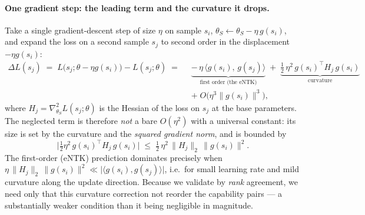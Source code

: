 \documentclass{article} %
\begin{document}
\paragraph{One gradient step: the leading term and the curvature it drops.}
Take a single gradient-descent step of size $\eta$ on sample $s_i$,
$\theta_S \leftarrow \theta_S - \eta\, g(s_i)$, and expand the loss on a second sample $s_j$ to
second order in the displacement $-\eta g(s_i)$:
\begin{equation}
\begin{split}
  \Delta L(s_j)
  \;=\; L\!\big(s_j;\theta - \eta g(s_i)\big) - L(s_j;\theta)
  \;=\;\; & \underbrace{-\,\eta\,\big\langle g(s_i),\, g(s_j)\big\rangle}_{\text{first order (the eNTK)}}
  \;+\; \underbrace{\tfrac{1}{2}\,\eta^2\, g(s_i)^{\!\top} H_j\, g(s_i)}_{\text{curvature}} \\[2pt]
  & +\; O\!\big(\eta^3 \|g(s_i)\|^3\big),
\end{split}
  \label{eq:secondorder}
\end{equation}
where $H_j = \nabla^2_{\theta_S} L(s_j;\theta)$ is the Hessian of the loss on $s_j$ at the base
parameters. The neglected term is therefore \emph{not} a bare $O(\eta^2)$ with a universal
constant: its size is set by the curvature and the \emph{squared gradient norm}, and is bounded by
\begin{equation}
  \Big|\tfrac{1}{2}\eta^2\, g(s_i)^{\!\top} H_j\, g(s_i)\Big|
  \;\le\; \tfrac{1}{2}\,\eta^2\,\|H_j\|_2\,\|g(s_i)\|^2 .
  \label{eq:curvbound}
\end{equation}
The first-order (eNTK) prediction dominates precisely when
$\eta\,\|H_j\|_2\,\|g(s_i)\|^2 \ll \big|\langle g(s_i),g(s_j)\rangle\big|$, i.e.\ for small learning
rate and mild curvature along the update direction. Because we validate by \emph{rank} agreement,
we need only that this curvature correction not reorder the capability pairs --- a substantially
weaker condition than it being negligible in magnitude.
\end{document}
